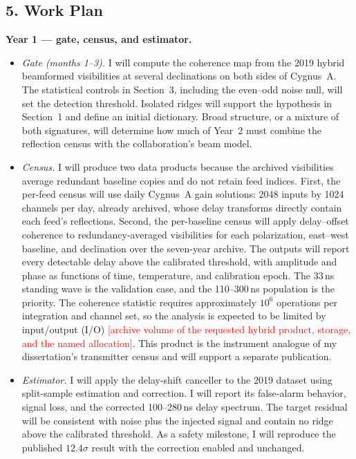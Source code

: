 \documentclass[12pt]{article}
\newcommand{\todo}[1]{\textcolor{red}{[#1]}}
\begin{document}
\subsection*{5. Work Plan}

\textbf{Year 1 --- gate, census, and estimator.}
\begin{itemize}
\item \emph{Gate (months 1--3).} I will compute the coherence map from the 2019 hybrid beamformed visibilities at several declinations on both sides of Cygnus~A. The statistical controls in Section~3, including the even--odd noise null, will set the detection threshold. Isolated ridges will support the hypothesis in Section~1 and define an initial dictionary. Broad structure, or a mixture of both signatures, will determine how much of Year~2 must combine the reflection census with the collaboration's beam model.
\item \emph{Census.} I will produce two data products because the archived visibilities average redundant baseline copies and do not retain feed indices. First, the per-feed census will use daily Cygnus~A gain solutions: 2048 inputs by 1024 channels per day, already archived, whose delay transforms directly contain each feed's reflections. Second, the per-baseline census will apply delay--offset coherence to redundancy-averaged visibilities for each polarization, east--west baseline, and declination over the seven-year archive. The outputs will report every detectable delay above the calibrated threshold, with amplitude and phase as functions of time, temperature, and calibration epoch. The 33\,ns standing wave is the validation case, and the 110--300\,ns population is the priority. The coherence statistic requires approximately $10^6$ operations per integration and channel set, so the analysis is expected to be limited by input/output (I/O) \todo{archive volume of the requested hybrid product, storage, and the named allocation}. This product is the instrument analogue of my dissertation's transmitter census and will support a separate publication.
\item \emph{Estimator.} I will apply the delay-shift canceller to the 2019 dataset using split-sample estimation and correction. I will report its false-alarm behavior, signal loss, and the corrected 100--280\,ns delay spectrum. The target residual will be consistent with noise plus the injected signal and contain no ridge above the calibrated threshold. As a safety milestone, I will reproduce the published $12.4\sigma$ result with the correction enabled and unchanged.
\end{itemize}
\end{document}
